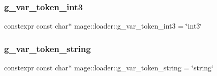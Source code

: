 \subsubsection{\texorpdfstring{g\+\_\+var\+\_\+token\+\_\+int3}{g\_var\_token\_int3}}
{\footnotesize\ttfamily constexpr const char$\ast$ mage\+::loader\+::g\+\_\+var\+\_\+token\+\_\+int3 = \char`\"{}int3\char`\"{}}

\hypertarget{namespacemage_1_1loader_adec72619d7286e73229e6f1049cc7195}{}\label{namespacemage_1_1loader_adec72619d7286e73229e6f1049cc7195} 
\subsubsection{\texorpdfstring{g\+\_\+var\+\_\+token\+\_\+string}{g\_var\_token\_string}}
{\footnotesize\ttfamily constexpr const char$\ast$ mage\+::loader\+::g\+\_\+var\+\_\+token\+\_\+string = \char`\"{}string\char`\"{}}

